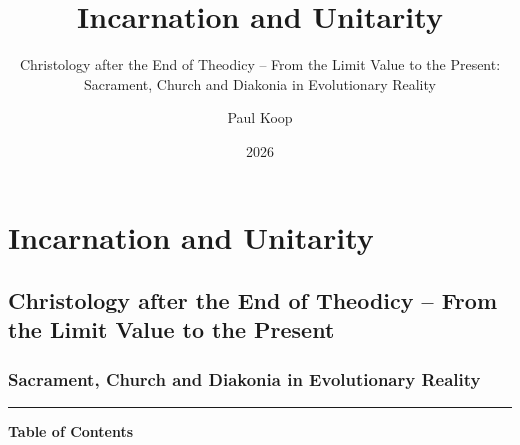 \documentclass[
  english,
]{article}
\title{Incarnation and Unitarity}
\subtitle{Christology after the End of Theodicy -- From the Limit Value
to the Present: Sacrament, Church and Diakonia in Evolutionary Reality}
\author{Paul Koop}
\date{2026}
\begin{document}
\maketitle

{
\setcounter{tocdepth}{3}
\tableofcontents
}
\section{Incarnation and Unitarity}\label{incarnation-and-unitarity}

\subsection{Christology after the End of Theodicy -- From the Limit
Value to the
Present}\label{christology-after-the-end-of-theodicy-from-the-limit-value-to-the-present}

\subsubsection{Sacrament, Church and Diakonia in Evolutionary
Reality}\label{sacrament-church-and-diakonia-in-evolutionary-reality}

\begin{center}\rule{0.5\linewidth}{0.5pt}\end{center}

\textbf{Table of Contents}
\end{document}
